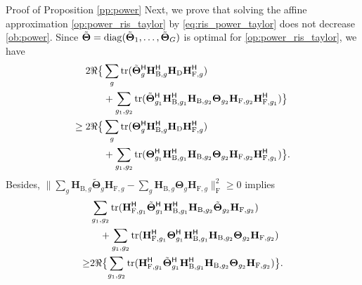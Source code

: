 \documentclass[journal]{IEEEtran}
\begin{document}
\begin{appendix}
\begin{subsection}{Proof of Proposition \ref{pp:power}}
		Next, we prove that solving the affine approximation \eqref{op:power_ris_taylor} by \eqref{eq:ris_power_taylor} does not decrease \eqref{ob:power}.
		Since $\tilde{\mathbf{\Theta}} = \operatorname{diag}(\tilde{\mathbf{\Theta}}_1, \ldots, \tilde{\mathbf{\Theta}}_G)$ is optimal for \eqref{op:power_ris_taylor}, we have
		\begin{equation}
			\label{iq:power_ris_taylor}
			\begin{split}
				2 \Re \bigl\{ & \sum\limits_g \operatorname{tr}(\tilde{\mathbf{\Theta}}_g^\mathsf{H} \mathbf{H}_{\mathrm{B},g}^\mathsf{H} \mathbf{H}_\mathrm{D} \mathbf{H}_{\mathrm{F},g}^\mathsf{H}) \\
				& + \sum\limits_{g_1,g_2} \operatorname{tr}(\tilde{\mathbf{\Theta}}_{g_1}^\mathsf{H} \mathbf{H}_{\mathrm{B},g_1}^\mathsf{H} \mathbf{H}_{\mathrm{B},g_2} \mathbf{\Theta}_{g_2} \mathbf{H}_{\mathrm{F},g_2} \mathbf{H}_{\mathrm{F},g_1}^\mathsf{H})\bigr\} \\
				\ge 2 \Re \bigl\{ &\sum\limits_g \operatorname{tr}({\mathbf{\Theta}}_g^\mathsf{H} \mathbf{H}_{\mathrm{B},g}^\mathsf{H} \mathbf{H}_\mathrm{D} \mathbf{H}_{\mathrm{F},g}^\mathsf{H}) \\
				& + \sum\limits_{g_1,g_2} \operatorname{tr}({\mathbf{\Theta}}_{g_1}^\mathsf{H} \mathbf{H}_{\mathrm{B},g_1}^\mathsf{H} \mathbf{H}_{\mathrm{B},g_2} \mathbf{\Theta}_{g_2} \mathbf{H}_{\mathrm{F},g_2} \mathbf{H}_{\mathrm{F},g_1}^\mathsf{H})\bigr\}.
			\end{split}
		\end{equation}
		Besides, $\lVert \sum_g \mathbf{H}_{\mathrm{B},g} \tilde{\mathbf{\Theta}}_g \mathbf{H}_{\mathrm{F},g} - \sum_g \mathbf{H}_{\mathrm{B},g} \mathbf{\Theta}_g \mathbf{H}_{\mathrm{F},g} \rVert _\mathrm{F}^2 \ge 0$ implies
		\begin{equation}
			\label{iq:auxiliary_nonnegative}
			\begin{split}
				& \sum\limits_{g_1,g_2} \tr(\mathbf{H}_{\mathrm{F},g_1}^\mathsf{H} \tilde{\mathbf{\Theta}}_{g_1}^\mathsf{H} \mathbf{H}_{\mathrm{B},g_1}^\mathsf{H} \mathbf{H}_{\mathrm{B},g_2} \tilde{\mathbf{\Theta}}_{g_2} \mathbf{H}_{\mathrm{F},g_2}) \\
				& \quad + \sum\limits_{g_1,g_2} \tr(\mathbf{H}_{\mathrm{F},g_1}^\mathsf{H} {\mathbf{\Theta}}_{g_1}^\mathsf{H} \mathbf{H}_{\mathrm{B},g_1}^\mathsf{H} \mathbf{H}_{\mathrm{B},g_2} {\mathbf{\Theta}}_{g_2} \mathbf{H}_{\mathrm{F},g_2}) \\
				\ge & 2 \Re \bigl\{\sum\limits_{g_1,g_2} \tr(\mathbf{H}_{\mathrm{F},g_1}^\mathsf{H} \tilde{\mathbf{\Theta}}_{g_1}^\mathsf{H} \mathbf{H}_{\mathrm{B},g_1}^\mathsf{H} \mathbf{H}_{\mathrm{B},g_2} \mathbf{\Theta}_{g_2} \mathbf{H}_{\mathrm{F},g_2})\bigr\}.

\end{split}
\end{equation}
\end{subsection}
\end{appendix}
\end{document}
